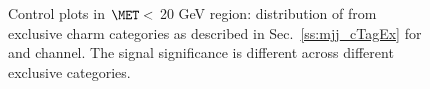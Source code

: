 \begin{figure}
    \caption{Control plots in $\MET <$ 20 GeV region: distribution of \mjj from exclusive charm categories as described in
    Sec.~\ref{ss:mjj_cTagEx} for \mujets and \ejets channel. The signal significance is different across different
    exclusive categories.}
    \label{fig:LowMET_mjjCTagEx}
    \end{figure}

